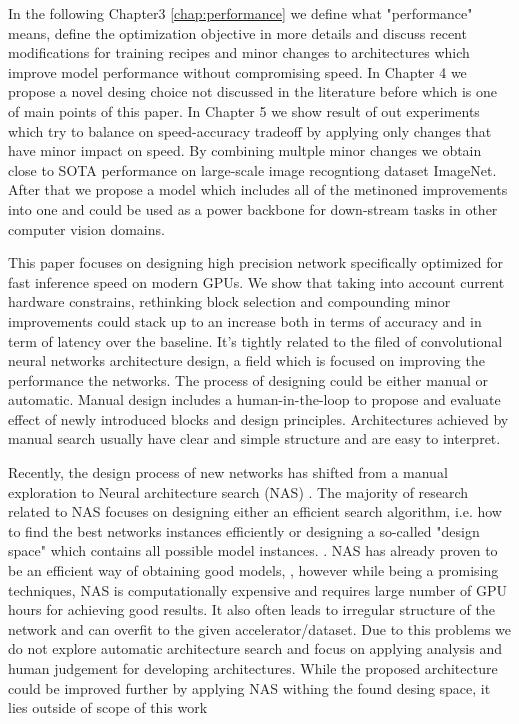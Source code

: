 In the following Chapter3 \ref{chap:performance} we define what "performance" means, define the optimization objective in more details and discuss recent modifications for training recipes and minor changes to architectures which improve model performance without compromising speed. In Chapter 4 we propose a novel desing choice not discussed in the literature before which is one of main points of this paper. In Chapter 5 we show result of out experiments which try to balance on speed-accuracy tradeoff by applying only changes that have minor impact on speed. By combining multple minor changes we obtain close to SOTA performance on large-scale image recogntiong dataset ImageNet. After that we propose a model which includes all of the metinoned improvements into one and could be used as a power backbone for down-stream tasks in other computer vision domains.

This paper focuses on designing high precision network specifically optimized for fast inference speed on modern GPUs. We show that taking into account current hardware constrains, rethinking block selection and compounding minor improvements could stack up to an increase both in terms of accuracy and in term of latency over the baseline. It's tightly related to the filed of convolutional neural networks architecture design, a field which is focused on improving the performance the networks. The process of designing could be either manual or automatic. Manual design includes a human-in-the-loop to propose and evaluate effect of newly introduced blocks and design principles. Architectures achieved by manual search usually have clear and simple structure and are easy to interpret. 

Recently, the design process of new networks has shifted from a manual exploration to Neural architecture search (NAS) \cite{real2019_nas1}. The majority of research related to NAS focuses on designing either an efficient search algorithm, i.e. how to find the best networks instances efficiently \cite{zoph2018_nasnet} \cite{pham2018_nas_efficient} or designing a so-called "design space" which contains all possible model instances. \cite{radosavovic2020_designing} \cite{liu2018_nas_progressive}. NAS has already proven to be an efficient way of obtaining good models, \cite{tan2019_efficientnet} \cite{lin2020neural_genet} \cite{pham2018_nas_efficient}, however while being a promising techniques, NAS is computationally expensive and requires large number of GPU hours for achieving good results. It also often leads to irregular structure of the network and can overfit to the given accelerator/dataset. Due to this problems we do not explore automatic architecture search and focus on applying analysis and human judgement for developing architectures. While the proposed architecture could be improved further by applying NAS withing the found desing space, it lies outside of scope of this work




